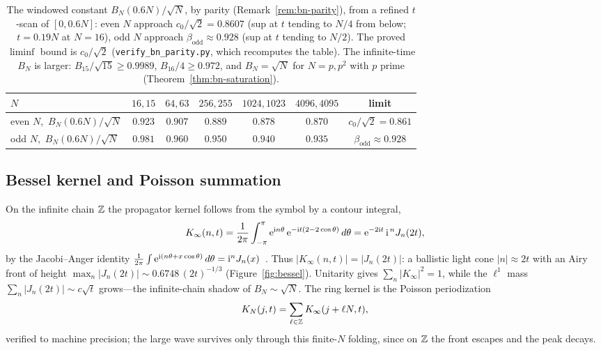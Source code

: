 \begin{table}[ht]\centering
\caption{The windowed constant $B_N(0.6N)/\sqrt N$, by parity (Remark~\ref{rem:bn-parity}), from a refined
$t$-scan of $[0,0.6N]$: even $N$ approach $c_0/\sqrt2=0.8607$ (sup at $t$ tending to $N/4$ from below; $t=0.19N$
at $N=16$), odd $N$ approach $\beta_{\mathrm{odd}}\approx0.928$ (sup at $t$ tending to $N/2$). The proved
$\liminf$ bound is $c_0/\sqrt2$ (\texttt{verify\_bn\_parity.py}, which recomputes the table). The infinite-time $B_N$ is larger: $B_{15}/\sqrt{15}\ge0.9989$,
$B_{16}/4\ge0.972$, and $B_N=\sqrt N$ for $N=p,p^2$ with $p$ prime (Theorem~\ref{thm:bn-saturation}).}\label{tab:bn}
\begin{tabular}{lccccc c}
\toprule
$N$ & $16,15$ & $64,63$ & $256,255$ & $1024,1023$ & $4096,4095$ & limit\\
\midrule
even $N$,\ $B_N(0.6N)/\sqrt N$ & $0.923$ & $0.907$ & $0.889$ & $0.878$ & $0.870$ & $c_0/\sqrt2=0.861$\\
odd $N$,\ $B_N(0.6N)/\sqrt N$  & $0.981$ & $0.960$ & $0.950$ & $0.940$ & $0.935$ & $\beta_{\mathrm{odd}}\approx0.928$\\
\bottomrule
\end{tabular}
\end{table}

\subsection{Bessel kernel and Poisson summation}
On the infinite chain $\mathbb{Z}$ the propagator kernel follows from the symbol by a contour integral,
\begin{equation}\label{eq:bessel}
  K_\infty(n,t)=\frac1{2\pi}\int_{-\pi}^{\pi}\mathrm{e}^{\mathrm in\theta}\,\mathrm{e}^{-\mathrm it(2-2\cos\theta)}\,d\theta
  =\mathrm{e}^{-2\mathrm it}\,\mathrm i^{\,n}J_n(2t),
\end{equation}
by the Jacobi--Anger identity $\frac1{2\pi}\int\mathrm{e}^{\mathrm i(n\theta+x\cos\theta)}\,d\theta=\mathrm i^nJ_n(x)$~\cite{Watson}.
Thus $|K_\infty(n,t)|=|J_n(2t)|$: a ballistic light cone $|n|\approx2t$ with an Airy front of height
$\max_n|J_n(2t)|\sim0.6748\,(2t)^{-1/3}$ (Figure~\ref{fig:bessel}). Unitarity gives $\sum_n|K_\infty|^2=1$,
while the $\ell^1$ mass $\sum_n|J_n(2t)|\sim c\sqrt t$ grows---the infinite-chain shadow of
$B_N\sim\sqrt N$. The ring kernel is the Poisson periodization
\begin{equation}\label{eq:poisson}
  K_N(j,t)=\sum_{\ell\in\mathbb{Z}}K_\infty(j+\ell N,t),
\end{equation}
verified to machine precision; the large wave survives only through this finite-$N$ folding, since on
$\mathbb{Z}$ the front escapes and the peak decays.


